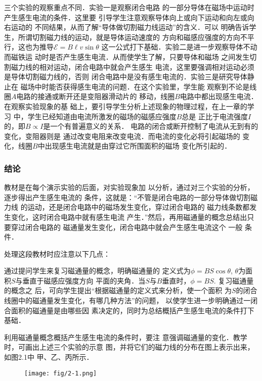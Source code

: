 三个实验的观察重点不同．实验一是观察闭合电路
的一部分导体在磁场中运动时产生感生电流的条件．这里要
引导学生注意观察导体向上或向下运动和向左或向右运动的
不同结果，从而了解“导体做切割磁力线运动”的含义．可以
明确告诉学生，所谓切割磁力线的运动，就是导体运动速度的
方向和磁感应强度的方向不平行，这也为推导$\mathcal{E}=B\ell v\sin\theta$
这一公式打下基础．实验二是进一步观察导体不动而磁铁运
动时是否产生感生电流．从而使学生了解，只要导体和磁场
之间发生切割磁力线的相对运动，闭合电路中就会产生感生
电流，这里要强调相对运动必须是导体切割磁力线的，否则
闭合电路中是没有感生电流的．实验三是研究导体静止在
磁场中时能否获得感生电流的问题．在这个实验里，学生能
观察到不论是线圈$A$电路的接通或断开还是变阻器滑动片的
移动，线圈$B$电路中都出现感生电流．在观察实验现象的基
础上，要引导学生分析上述现象的物理过程，在上一章的学习
中，学生已经知道由电流所激发的磁场的磁感应强度$B$总是
正比于电流强度$I$的，即$B\propto I$是一个有普遍意义的关系．
电路的闭合或断开控制了电流从无到有的变化，变阻器则是
通过改变电阻来改变电流．而电流的变化必将引起磁场的
变化，线圈$B$中出现感生电流就是由穿过它所围面积的磁场
变化所引起的．

\subsubsection{结论}

教材是在每个演示实验的后面，对实验现象加
以分析，通过对三个实验的分析，逐步得出产生感生电流的
条件，这就是：“不管是闭合电路的一部分导体做切割磁力线
的运动，还是闭合电路中的磁场发生变化，穿过闭合电路的
磁力线条数都发生变化，这时闭合电路中就有感生电流
产生．”然后，再用磁通量的概念总结出只要穿过闭合电路的
磁通量发生变化，闭合电路中就会产生感生电流这个 一般
条件．

处理这段教材时应注意以下几点：

通过提问学生来复习磁通量的概念，明确磁通量的
定义式为$\phi=BS\cos\theta$, $\theta$为面积$S$与垂直于磁感应强度方向
平面的夹角．当$S$与$B$垂直时，$\phi=BS$. 复习磁通量的概念之
后，可向学生提出“根据磁通量的定义式来分析，使一个面积
为$S$的闭合线圈中的磁通量发生变化，有哪几种方法”的问题，
以使学生进一步明确通过一闭合面积的磁通量是由哪些因
素决定的，同时为总结概括产生感生电流的条件打下基础．

利用磁通量概念概括产生感生电流的条件时，要注
意强调磁通量的变化．教学时，可画出上述三个实验的示意
图，并将它们的磁力线的分布在图上表示出来，如图2.1中
甲、乙、丙所示．
\begin{figure}[htp]
    \centering
\texttt{[image: fig/2-1.png]}    
    \caption{}
\end{figure}

